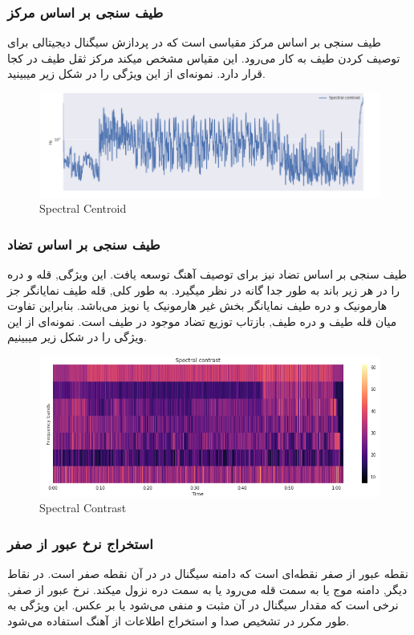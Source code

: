\documentclass[conference]{IEEEtran}
\begin{document}
    \subsubsection{ طیف سنجی بر اساس مرکز      }
طیف سنجی بر اساس مرکز مقیاسی است که در پردازش سیگنال دیجیتالی برای توصیف کردن طیف به کار می‌رود. این مقیاس مشخص میکند مرکز ثقل طیف در کجا قرار دارد. نمونه‌ای از این ویژگی را در شکل زیر میبینید. 
    \begin{figure}[h!]
\includegraphics[width=\linewidth]{4.png}
      \caption{  Spectral Centroid
}
      \label{fig:fig 1}
    \end{figure}


    \subsubsection{ طیف سنجی بر اساس تضاد       }
طیف سنجی بر اساس تضاد نیز برای توصیف آهنگ توسعه یافت. این ویژگی, قله و دره را در هر زیر باند به طور جدا گانه در نظر میگیرد. به طور کلی, قله طیف نمایانگر جز هارمونیک و دره طیف نمایانگر بخش غیر هارمونیک یا نویز می‌باشد. بنابراین تفاوت میان قله طیف و دره طیف, بازتاب توزیع تضاد موجود در طیف است. نمونه‌ای از این ویژگی را در شکل زیر میبینیم. 

    \begin{figure}[h!]
\includegraphics[width=\linewidth]{5.png}
      \caption{  Spectral Contrast
}
      \label{fig:fig 1}
    \end{figure}

\subsubsection{ استخراج نرخ عبور از صفر
       }
نقطه عبور از صفر نقطه‌ای است که دامنه سیگنال در در آن نقطه صفر است. در نقاط دیگر, دامنه  موج یا به سمت قله می‌رود یا به سمت دره نزول میکند. 
نرخ عبور از صفر, نرخی است که مقدار سیگنال در آن مثبت و منفی می‌شود یا بر عکس. این ویژگی به طور مکرر در تشخیص صدا و استخراج اطلاعات از آهنگ استفاده می‌شود.
\end{document}
